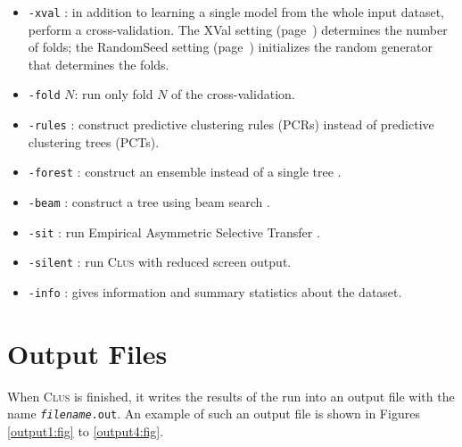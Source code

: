 \documentclass[a4paper]{report}
\newcommand{\clus}{\textsc{Clus}}
\begin{document}
\begin{itemize}
\item {\tt -xval} : in addition to learning a single model from the whole input dataset, perform a cross-validation.  The XVal setting (page~\pageref{sett:xval}) determines the number of folds; the RandomSeed setting (page~\pageref{sett:seed}) initializes the random generator that determines the folds.

\item {\tt -fold} $N$: run only fold $N$ of the cross-validation.

\item {\tt -rules} : construct predictive clustering rules (PCRs) instead of predictive clustering trees (PCTs).

\item {\tt -forest} : construct an ensemble instead of a single tree \cite{Kocev07b:proc}.

\item {\tt -beam} : construct a tree using beam search \cite{Kocev07a:proc}.

\item {\tt -sit} : run Empirical Asymmetric Selective Transfer \cite{Piccart08-DS-:proc}.

\item {\tt -silent} : run \clus{} with reduced screen output.

\item {\tt -info} : gives information and summary statistics about the dataset.
\end{itemize}


\chapter{Output Files}
\label{ch:output}

When \clus{} is finished, it writes the results of the run into an output file with the name
{\tt {\em filename}.out}.  An example of such an output file is shown in Figures \ref{output1:fig} to \ref{output4:fig}.
\end{document}
